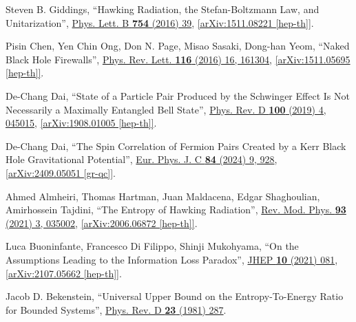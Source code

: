 \documentclass[12pt,preprintnumbers, floatfix, preprintnumbers, letterpaper, superscriptaddress,nofootinbib]{revtex4-2}
\begin{document}
\begin{thebibliography}{99}
Steven B. Giddings, ``Hawking Radiation, the Stefan-Boltzmann Law, and Unitarization'', {\hypersetup{urlcolor=vividviolet}\href{https://www.sciencedirect.com/science/article/pii/S0370269316000022?via\%3Dihub}{Phys. Lett. B \textbf{754} (2016) 39}}, \href{https://arxiv.org/abs/1511.08221}{[arXiv:1511.08221 [hep-th]]}.

Pisin Chen, Yen Chin Ong, Don N. Page, Misao Sasaki, Dong-han Yeom, ``Naked Black Hole Firewalls'', {\hypersetup{urlcolor=vividviolet}\href{https://journals.aps.org/prl/abstract/10.1103/PhysRevLett.116.161304}{Phys. Rev. Lett. \textbf{116} (2016) 16, 161304}}, \href{https://arxiv.org/abs/1511.05695}{[arXiv:1511.05695 [hep-th]]}.

De-Chang Dai, ``State of a Particle Pair Produced by the Schwinger Effect Is Not Necessarily a Maximally Entangled Bell State'', {\hypersetup{urlcolor=vividviolet}\href{https://journals.aps.org/prd/abstract/10.1103/PhysRevD.100.045015}{Phys. Rev. D \textbf{100} (2019) 4, 045015}}, \href{https://arxiv.org/abs/1908.01005}{[arXiv:1908.01005 [hep-th]]}.

De-Chang Dai, ``The Spin Correlation of Fermion Pairs Created by a Kerr Black Hole Gravitational Potential'', {\hypersetup{urlcolor=vividviolet}\href{https://link.springer.com/article/10.1140/epjc/s10052-024-13288-2}{Eur. Phys. J. C \textbf{84} (2024) 9, 928}}, \href{https://arxiv.org/abs/2409.05051}{[arXiv:2409.05051 [gr-qc]]}.


Ahmed Almheiri, Thomas Hartman, Juan Maldacena, Edgar Shaghoulian, Amirhossein Tajdini, ``The Entropy of Hawking Radiation'', {\hypersetup{urlcolor=vividviolet}\href{https://journals.aps.org/rmp/abstract/10.1103/RevModPhys.93.035002}{Rev. Mod. Phys. \textbf{93} (2021) 3, 035002}}, \href{https://arxiv.org/abs/2006.06872}{[arXiv:2006.06872 [hep-th]]}.

Luca Buoninfante, Francesco Di Filippo, Shinji Mukohyama, ``On the Assumptions Leading to the Information Loss Paradox'', {\hypersetup{urlcolor=vividviolet}\href{https://doi.org/10.1007/JHEP10(2021)081}{JHEP \textbf{10} (2021) 081}}, \href{https://arxiv.org/abs/2107.05662}{[arXiv:2107.05662 [hep-th]]}.

Jacob D. Bekenstein, ``Universal Upper Bound on the Entropy-To-Energy Ratio for Bounded Systems'', {\hypersetup{urlcolor=vividviolet}\href{https://journals.aps.org/prd/abstract/10.1103/PhysRevD.23.287}{Phys. Rev. D \textbf{23} (1981) 287}}.


\end{thebibliography}
\end{document}
